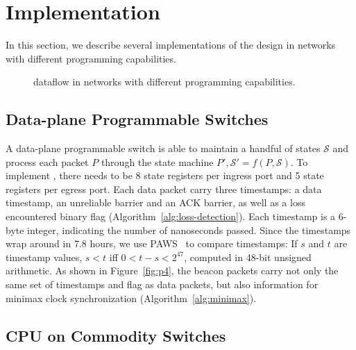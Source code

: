 \section{Implementation}
\label{sec:impl}

In this section, we describe several implementations of the \sys design in networks with different programming capabilities.

\begin{figure*}[t]
\centering
{}
\hspace{0.04\textwidth}
\hspace{0.04\textwidth}
\caption{\sys dataflow in networks with different programming capabilities.}
\label{fig:impl}
\vspace{-1em}
\end{figure*}

\subsection{Data-plane Programmable Switches}
\label{sec:p4}

A data-plane programmable switch is able to maintain a handful of states $\mathcal{S}$ and process each packet $P$ through the state machine $P', \mathcal{S}' = f(P, \mathcal{S})$.
To implement \sys, there needs to be 8 state registers per ingress port and 5 state registers per egress port.
Each data packet carry three timestamps: a data timestamp, an unreliable barrier and an ACK barrier, as well as a loss encountered binary flag (Algorithm~\ref{alg:loss-detection}).
Each timestamp is a 6-byte integer, indicating the number of nanoseconds passed. Since the timestamps wrap around in 7.8 hours, we use PAWS~\cite{jacobson1992tcp} to compare timestamps: If $s$ and $t$ are timestamp values, $s < t$ iff $0 < t - s < 2^{47}$, computed in 48-bit unsigned arithmetic.
As shown in Figure~\ref{fig:p4}, the beacon packets carry not only the same set of timestamps and flag as data packets, but also information for minimax clock synchronization (Algorithm~\ref{alg:minimax}).

\subsection{CPU on Commodity Switches}
\label{sec:commodity}

